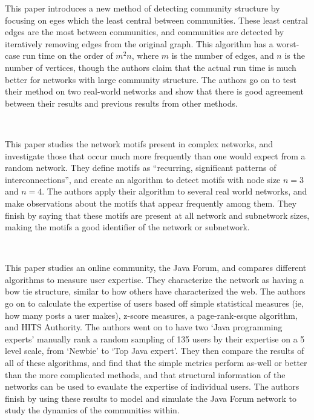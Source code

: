 \documentclass{tufte-handout}
\begin{document}
This paper introduces a new method of detecting community structure by focusing on eges which the least central between communities. These least central edges are the most between communities, and communities are detected by iteratively removing edges from the original graph. This algorithm has a worst-case run time on the order of $m^2n$, where $m$ is the number of edges, and $n$ is the number of vertices, though the authors claim that the actual run time is much better for networks with large community structure. The authors go on to test their method on two real-world networks and show that there is good agreement between their results and previous results from other methods. \\
\vspace{1em}

~\cite{milo2002network}

This paper studies the network motifs present in complex networks, and investigate those that occur much more frequently than one would expect from a random network. They define motifs as ``recurring, significant patterns of interconnections'', and create an algorithm to detect motifs with node size $n=3$ and $n=4$. The authors apply their algorithm to several real world networks, and make observations about the motifs that appear frequently among them. They finish by saying that these motifs are present at all network and subnetwork sizes, making the motifs a good identifier of the network or subnetwork. \\
\vspace{1em}

~\cite{zhang2007expertise}

This paper studies an online community, the Java Forum, and compares different algorithms to measure user expertise. They characterize the network as having a bow tie structure, similar to how others have characterized the web. The authors go on to calculate the expertise of users based off simple statistical measures (ie, how many posts a user makes), z-score measures, a page-rank-esque algorithm, and HITS Authority. The authors went on to have two `Java programming experts' manually rank a random sampling of 135 users by their expertise on a 5 level scale, from `Newbie' to `Top Java expert'. They then compare the results of all of these algorithms, and find that the simple metrics perform as-well or better than the more complicated methods, and that structural information of the networks can be used to evaulate the expertise of individual users. The authors finish by using these results to model and simulate the Java Forum network to study the dynamics of the communities within.

\clearpage


\end{document}
